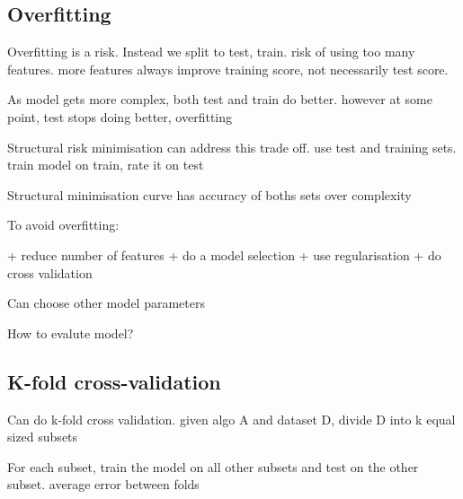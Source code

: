 
\subsection{Overfitting}

Overfitting is a risk. Instead we split to test, train. risk of using too many features. more features always improve training score, not necessarily test score.

As model gets more complex, both test and train do better. however at some point, test stops doing better, overfitting

Structural risk minimisation can address this trade off. use test and training sets. train model on train, rate it on test

Structural minimisation curve has accuracy of boths sets over complexity

To avoid overfitting:

+ reduce number of features
+ do a model selection
+ use regularisation
+ do cross validation 

Can choose other model parameters

How to evalute model?

\subsection{K-fold cross-validation}

Can do k-fold cross validation. given algo A and dataset D, divide D into k equal sized subsets

For each subset, train the model on all other subsets and test on the other subset. average error between folds


